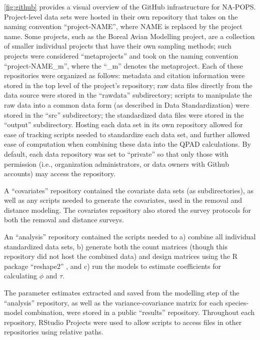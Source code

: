 \par \autoref{fig:github} provides a visual overview of the GitHub infrastructure for NA-POPS. Project-level data sets were hosted in their own repository that takes on the naming convention “project-NAME”, where NAME is replaced by the project name. Some projects, such as the Boreal Avian Modelling project, are a collection of smaller individual projects that have their own sampling methods; such projects were considered “metaprojects” and took on the naming convention “project-NAME\_m”, where the “\_m” denotes the metaproject. Each of these repositories were organized as follows: metadata and citation information were stored in the top level of the project’s repository; raw data files directly from the data source were stored in the “rawdata” subdirectory; scripts to manipulate the raw data into a common data form (as described in Data Standardization) were stored in the “src” subdirectory; the standardized data files were stored in the “output” subdirectory. Hosting each data set in its own repository allowed for ease of tracking scripts needed to standardize each data set, and further allowed ease of computation when combining these data into the QPAD calculations. By default, each data repository was set to “private” so that only those with permission (i.e., organization administrators, or data owners with Github accounts) may access the repository. 

\par A “covariates” repository contained the covariate data sets (as subdirectories), as well as any scripts needed to generate the covariates, used in the removal and distance modeling. The covariates repository also stored the survey protocols for both the removal and distance surveys.

\par An “analysis” repository contained the scripts needed to a) combine all individual standardized data sets, b) generate both the count matrices (though this repository did not host the combined data) and design matrices using the R package “reshape2” \citep{wickham_reshaping_2007}, and c) run the models to estimate coefficients for calculating $\phi$ and $\tau$. 

\par The parameter estimates extracted and saved from the modelling step of the “analysis” repository, as well as the variance-covariance matrix for each species-model combination, were stored in a public “results” repository.
Throughout each repository, RStudio Projects were used to allow scripts to access files in other repositories using relative paths.

